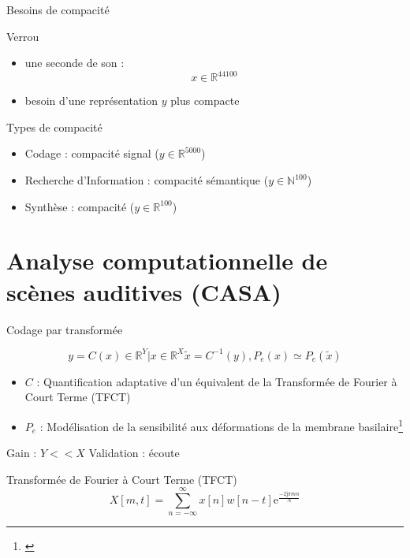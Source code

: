\documentclass[compress]{beamer}
\newcommand\citenote[4]{\footnote{#3 \href{#2}{\structure{#1}} #4}}
\begin{document}
\begin{frame}{Besoins de compacité}
\begin{block}{Verrou}
\begin{itemize}
\item une seconde de son : $$ x \in \mathbb{R}^{44100}$$
\item besoin d'une représentation $y$ plus compacte
\end{itemize}
\end{block}
\begin{block}{Types de compacité}
\begin{itemize}
\item Codage : compacité signal ($ y \in \mathbb{R}^{5000}$)
\item Recherche d'Information : compacité sémantique ($ y \in \mathbb{N}^{100}$)
\item Synthèse : compacité \alert{\og}  \alert{\fg} ($ y \in \mathbb{R}^{100}$)
\end{itemize}
\end{block}
\end{frame}

\section[CASA]{Analyse computationnelle de scènes auditives (CASA)}

\begin{frame}{Codage par transformée}

$$y = C(x) \in \mathbb{R}^Y | x \in \mathbb{R}^{X} \tilde{x} = C^{-1}(y), P_e(x) \simeq P_e(\tilde{x})$$
\begin{itemize}
\item $C$ : Quantification adaptative d'un équivalent de la Transformée de Fourier à Court Terme (TFCT)
\item $P_e$ : Modélisation de la sensibilité aux déformations de la membrane basilaire\citenote{Zwicker}{}{}{}
\end{itemize}
Gain : $Y<<X$
Validation : écoute
\end{frame}

\begin{frame}{Transformée de Fourier à Court Terme (TFCT)}
$$ X[m, t] = \sum_{n = - \infty}^{\infty} x[n] w[n-t] \mathrm{e}^{\frac{-2 \mathrm{j}  \pi m n}{N}} $$
\end{frame}
\end{document}
